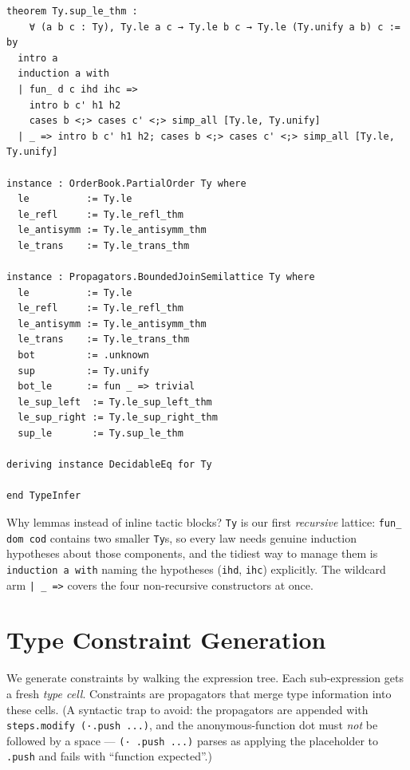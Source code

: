 \documentclass[12pt, a4paper, openright]{book}
\theoremstyle{thmstyle}
\theoremstyle{defstyle}
\newcommand{\lc}[1]{\texttt{#1}}
\begin{document}
\begin{verbatim}
theorem Ty.sup_le_thm :
    ∀ (a b c : Ty), Ty.le a c → Ty.le b c → Ty.le (Ty.unify a b) c := by
  intro a
  induction a with
  | fun_ d c ihd ihc =>
    intro b c' h1 h2
    cases b <;> cases c' <;> simp_all [Ty.le, Ty.unify]
  | _ => intro b c' h1 h2; cases b <;> cases c' <;> simp_all [Ty.le, Ty.unify]

instance : OrderBook.PartialOrder Ty where
  le          := Ty.le
  le_refl     := Ty.le_refl_thm
  le_antisymm := Ty.le_antisymm_thm
  le_trans    := Ty.le_trans_thm

instance : Propagators.BoundedJoinSemilattice Ty where
  le          := Ty.le
  le_refl     := Ty.le_refl_thm
  le_antisymm := Ty.le_antisymm_thm
  le_trans    := Ty.le_trans_thm
  bot         := .unknown
  sup         := Ty.unify
  bot_le      := fun _ => trivial
  le_sup_left  := Ty.le_sup_left_thm
  le_sup_right := Ty.le_sup_right_thm
  sup_le       := Ty.sup_le_thm

deriving instance DecidableEq for Ty

end TypeInfer
\end{verbatim}

Why lemmas instead of inline tactic blocks? \lc{Ty} is our first
\emph{recursive} lattice: \lc{fun\_ dom cod} contains two smaller
\lc{Ty}s, so every law needs genuine induction hypotheses about those
components, and the tidiest way to manage them is \lc{induction a with}
naming the hypotheses (\lc{ihd}, \lc{ihc}) explicitly. The wildcard arm
\lc{| \_ =>} covers the four non-recursive constructors at once.

\section{Type Constraint Generation}

We generate constraints by walking the expression tree. Each sub-expression
gets a fresh \emph{type cell}. Constraints are propagators that merge type
information into these cells. (A syntactic trap to avoid: the propagators
are appended with \lc{steps.modify (·.push ...)}, and the anonymous-function
dot must \emph{not} be followed by a space --- \lc{(· .push ...)} parses as
applying the placeholder to \lc{.push} and fails with ``function
expected''.)
\end{document}
